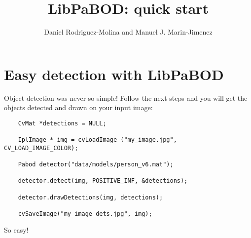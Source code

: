

\title{LibPaBOD: quick start}
\author{Daniel Rodriguez-Molina and Manuel J. Marin-Jimenez}

\maketitle

\section{Easy detection with LibPaBOD}

Object detection was never so simple! Follow the next steps and you will get the objects detected and drawn on your input image:

\begin{verbatim}
	CvMat *detections = NULL;

	IplImage * img = cvLoadImage ("my_image.jpg", CV_LOAD_IMAGE_COLOR);

	Pabod detector("data/models/person_v6.mat");
	
	detector.detect(img, POSITIVE_INF, &detections);
	
	detector.drawDetections(img, detections);

	cvSaveImage("my_image_dets.jpg", img);
\end{verbatim} 

\noindent So easy!



